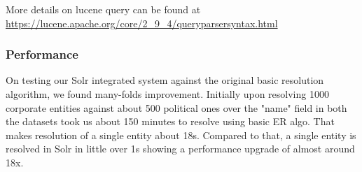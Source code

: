     More details on lucene query can be found at \url{https://lucene.apache.org/core/2\_9\_4/queryparsersyntax.html}
\subsubsection{Performance}
    On testing our Solr integrated system against the original basic resolution algorithm, we found many-folds improvement. Initially upon resolving 1000 corporate entities against about 500 political ones over the "name" field in both the datasets took us about 150 minutes to resolve using basic ER algo. That makes resolution of a single entity about 18s.
    Compared to that, a single entity is resolved in Solr in little over 1s showing a performance upgrade of almost around 18x.

